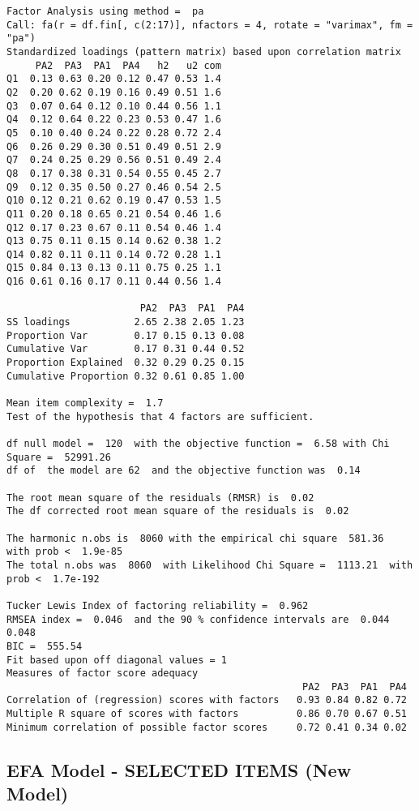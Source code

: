 \documentclass[
  letterpaper,
  DIV=11,
  numbers=noendperiod]{scrartcl}
\begin{document}
\begin{verbatim}
Factor Analysis using method =  pa
Call: fa(r = df.fin[, c(2:17)], nfactors = 4, rotate = "varimax", fm = "pa")
Standardized loadings (pattern matrix) based upon correlation matrix
     PA2  PA3  PA1  PA4   h2   u2 com
Q1  0.13 0.63 0.20 0.12 0.47 0.53 1.4
Q2  0.20 0.62 0.19 0.16 0.49 0.51 1.6
Q3  0.07 0.64 0.12 0.10 0.44 0.56 1.1
Q4  0.12 0.64 0.22 0.23 0.53 0.47 1.6
Q5  0.10 0.40 0.24 0.22 0.28 0.72 2.4
Q6  0.26 0.29 0.30 0.51 0.49 0.51 2.9
Q7  0.24 0.25 0.29 0.56 0.51 0.49 2.4
Q8  0.17 0.38 0.31 0.54 0.55 0.45 2.7
Q9  0.12 0.35 0.50 0.27 0.46 0.54 2.5
Q10 0.12 0.21 0.62 0.19 0.47 0.53 1.5
Q11 0.20 0.18 0.65 0.21 0.54 0.46 1.6
Q12 0.17 0.23 0.67 0.11 0.54 0.46 1.4
Q13 0.75 0.11 0.15 0.14 0.62 0.38 1.2
Q14 0.82 0.11 0.11 0.14 0.72 0.28 1.1
Q15 0.84 0.13 0.13 0.11 0.75 0.25 1.1
Q16 0.61 0.16 0.17 0.11 0.44 0.56 1.4

                       PA2  PA3  PA1  PA4
SS loadings           2.65 2.38 2.05 1.23
Proportion Var        0.17 0.15 0.13 0.08
Cumulative Var        0.17 0.31 0.44 0.52
Proportion Explained  0.32 0.29 0.25 0.15
Cumulative Proportion 0.32 0.61 0.85 1.00

Mean item complexity =  1.7
Test of the hypothesis that 4 factors are sufficient.

df null model =  120  with the objective function =  6.58 with Chi Square =  52991.26
df of  the model are 62  and the objective function was  0.14 

The root mean square of the residuals (RMSR) is  0.02 
The df corrected root mean square of the residuals is  0.02 

The harmonic n.obs is  8060 with the empirical chi square  581.36  with prob <  1.9e-85 
The total n.obs was  8060  with Likelihood Chi Square =  1113.21  with prob <  1.7e-192 

Tucker Lewis Index of factoring reliability =  0.962
RMSEA index =  0.046  and the 90 % confidence intervals are  0.044 0.048
BIC =  555.54
Fit based upon off diagonal values = 1
Measures of factor score adequacy             
                                                   PA2  PA3  PA1  PA4
Correlation of (regression) scores with factors   0.93 0.84 0.82 0.72
Multiple R square of scores with factors          0.86 0.70 0.67 0.51
Minimum correlation of possible factor scores     0.72 0.41 0.34 0.02
\end{verbatim}

\subsection{EFA Model - SELECTED ITEMS (New
Model)}\label{efa-model---selected-items-new-model}
\end{document}
